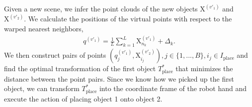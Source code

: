 \documentclass{article}
\newcommand{\pcx}[1]{\mathrm{X}^{(#1)}}
\begin{document}
Given a new scene, we infer the point clouds of the new objects $\pcx{v'_1}$ and $\pcx{v'_2}$. We calculate the positions of the virtual points with respect to the warped nearest neighbors,
\begin{align}
    q^{(v'_1)} = \frac{1}{L} \sum_{k=1}^L \pcx{v'_1}_{n_k} + \Delta_k.
\end{align}
We then construct pairs of points $(q^{(v'_1)}_j, \pcx{v'_2}_{i_j}), j \in \{1, ..., B\}, i_j \in I_{\mathrm{place}}$ and find the optimal transformation of the first object $T^*_{\mathrm{place}}$ that minimizes the distance between the point pairs. Since we know how we picked up the first object, we can transform $T^*_{\mathrm{place}}$ into the coordinate frame of the robot hand and execute the action of placing object 1 onto object 2.





\end{document}
